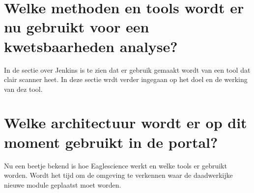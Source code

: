 \section{Welke methoden en tools wordt er nu gebruikt voor een kwetsbaarheden analyse?}
In de sectie over Jenkins is te zien dat er gebruik gemaakt wordt van een tool dat clair scanner heet. In deze sectie wrdt verder ingegaan op het doel en de werking van dez tool.

\section{Welke architectuur wordt er op dit moment gebruikt in de portal?}
Nu een beetje bekend is hoe Eaglescience werkt en welke tools er gebruikt worden. Wordt het tijd om de omgeving te verkennen waar de daadwerkijke nieuwe module geplaatst moet worden.
